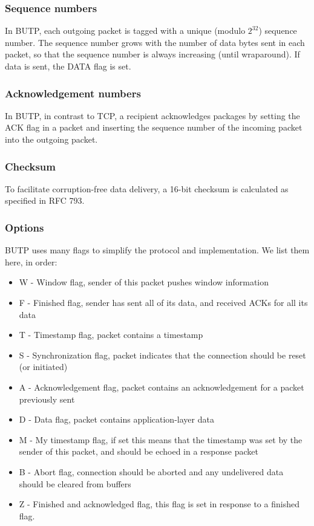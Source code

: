 \documentclass{article}
\begin{document}
\subsubsection{Sequence numbers}
In BUTP, each outgoing packet is tagged with a unique (modulo $2^{32}$) sequence number. The sequence number grows with the number of data bytes sent in each packet, so that the sequence number is always increasing (until wraparound). If data is sent, the DATA flag is set.

\subsubsection{Acknowledgement numbers}
In BUTP, in contrast to TCP, a recipient acknowledges packages by setting the ACK flag in a packet and inserting the sequence number of the incoming packet into the outgoing packet.

\subsubsection{Checksum}
To facilitate corruption-free data delivery, a 16-bit checksum is calculated as specified in RFC 793.

\subsubsection{Options}
BUTP uses many flags to simplify the protocol and implementation. We list them here, in order:
\begin{itemize}
  \item W - Window flag, sender of this packet pushes window information
  \item F - Finished flag, sender has sent all of its data, and received ACKs for all its data
  \item T - Timestamp flag, packet contains a timestamp
  \item S - Synchronization flag, packet indicates that the connection should be reset (or initiated)
  \item A - Acknowledgement flag, packet contains an acknowledgement for a packet previously sent
  \item D - Data flag, packet contains application-layer data
  \item M - My timestamp flag, if set this means that the timestamp was set by the sender of this packet, and should be echoed in a response packet
  \item B - Abort flag, connection should be aborted and any undelivered data should be cleared from buffers
  \item Z - Finished and acknowledged flag, this flag is set in response to a finished flag.
\end{itemize}
\end{document}
